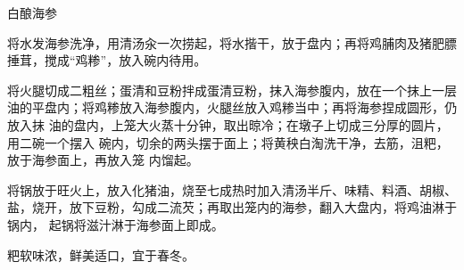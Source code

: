 \begin{recipe}[金钱海参]{白酿海参}

\ingredients


\preparation

\step 将水发海参洗净，用清汤汆一次捞起，将水揩干，放于盘内；再将鸡脯肉及猪肥膘
捶茸，搅成“鸡糁”，放入碗内待用。

\step 将火腿切成二粗丝；蛋清和豆粉拌成蛋清豆粉，抹入海参腹内，放在一个抹上一层
油的平盘内；将鸡糁放入海参腹内，火腿丝放入鸡糁当中；再将海参捏成圆形，仍放入抹
油的盘内，上笼大火蒸十分钟，取出晾冷；在墩子上切成三分厚的圆片，用二碗一个摆入
碗内，切余的两头摆于面上；将黄秧白淘洗干净，去筋，沮粑，放于海参面上，再放入笼
内馏起。

\step 将锅放于旺火上，放入化猪油，烧至七成热时加入清汤半斤、味精、料酒、胡椒、
盐，烧开，放下豆粉，勾成二流芡；再取出笼内的海参，翻入大盘内，将鸡油淋于锅内，
起锅将滋汁淋于海参面上即成。

\features

粑软味浓，鲜美适口，宜于春冬。

\end{recipe}

